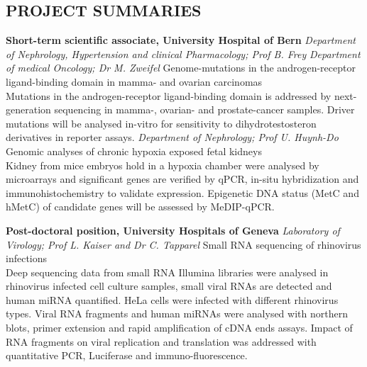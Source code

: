 \documentclass{res}
\begin{document}
\begin{resume}
\section{PROJECT SUMMARIES} 
\vspace{0.1in}
\textbf{Short-term scientific associate, University Hospital of Bern}
\textit{Department of Nephrology, Hypertension and clinical Pharmacology; Prof B. Frey} 
\textit{Department of medical Oncology; Dr M. Zweifel}
Genome-mutations in the androgen-receptor ligand-binding domain in mamma- and ovarian carcinomas \\
Mutations in the androgen-receptor ligand-binding domain is addressed by next-generation sequencing in mamma-, ovarian- and prostate-cancer samples. 
Driver mutations will be analysed in-vitro for sensitivity to dihydrotestosteron derivatives in reporter assays.
\textit{Department of Nephrology; Prof U. Huynh-Do}
Genomic analyses of chronic hypoxia exposed fetal kidneys \\
Kidney from mice embryos hold in a hypoxia chamber were analysed by microarrays and significant genes are verified by qPCR, in-situ hybridization and immunohistochemistry to validate expression. Epigenetic DNA status (MetC and hMetC) of candidate genes will be assessed by MeDIP-qPCR.
\,

\textbf{Post-doctoral position, University Hospitals of Geneva}
\textit{Laboratory of Virology; Prof L. Kaiser and Dr C. Tapparel}
Small RNA sequencing of rhinovirus infections \\
Deep sequencing data from small RNA Illumina libraries were analysed in rhinovirus infected cell culture samples, small viral RNAs are detected and human miRNA quantified. HeLa cells were infected with different rhinovirus types. Viral RNA fragments and human miRNAs were analysed with northern blots, primer extension and rapid amplification of cDNA ends assays. Impact of RNA fragments on viral replication and translation was addressed with quantitative PCR, Luciferase and immuno-fluorescence.
\,


\end{resume}
\end{document}
